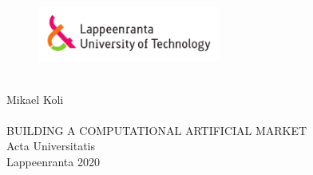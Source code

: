 
\thispagestyle{empty} \setlength{\parindent}{0pt}
\begin{figure}
\includegraphics[width=60mm]{./figs/Merkki_Logo_CMYK}\\
\end{figure}
~\\

\vspace{60mm}
{\sffamily\large Mikael Koli\\
\\
\MakeUppercase{\Large Building a Computational Artificial Market}}\\



{\sffamily\normalsize Acta Universitatis\\
Lappeenranta 2020}

